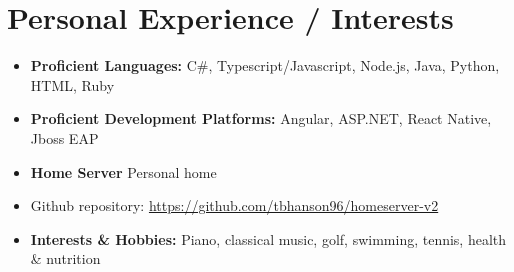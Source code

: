 \documentclass[11pt,letterpaper,sans]{moderncv}        %
\begin{document}
\section{Personal Experience / Interests}

\begin{itemize}[leftmargin=0.2in]
\setlength\itemsep{-3pt}
\item \textbf{Proficient Languages:} C\#, Typescript/Javascript, Node.js, Java, Python, HTML, Ruby
\item \textbf{Proficient Development Platforms:} Angular, ASP.NET, React Native, Jboss EAP
\item \textbf{Home Server} Personal home
\item Github repository: \url{https://github.com/tbhanson96/homeserver-v2}
\item \textbf{Interests \& Hobbies:} Piano, classical music, golf, swimming, tennis, health \& nutrition

\end{itemize}
\end{document}
